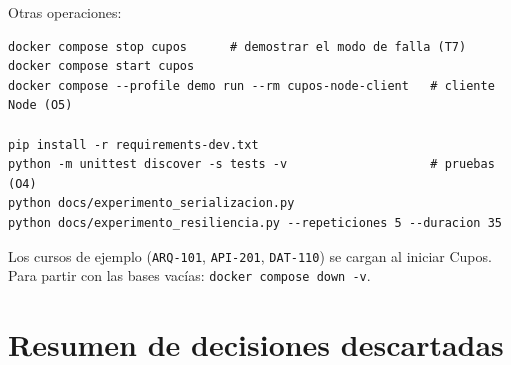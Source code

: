 \documentclass[11pt,spanish]{article}
\begin{document}
Otras operaciones:

\begin{verbatim}
docker compose stop cupos      # demostrar el modo de falla (T7)
docker compose start cupos
docker compose --profile demo run --rm cupos-node-client   # cliente Node (O5)

pip install -r requirements-dev.txt
python -m unittest discover -s tests -v                    # pruebas (O4)
python docs/experimento_serializacion.py
python docs/experimento_resiliencia.py --repeticiones 5 --duracion 35
\end{verbatim}

Los cursos de ejemplo (\texttt{ARQ-101}, \texttt{API-201}, \texttt{DAT-110}) se cargan al iniciar Cupos. Para partir con las bases vacías: \texttt{docker compose down -v}.

\section{Resumen de decisiones descartadas}
\end{document}
